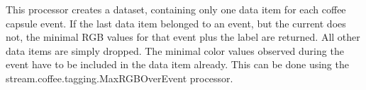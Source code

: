 This processor creates a dataset, containing only one data item for each coffee capsule event. If the last data item belonged to an event, but the current does not, the minimal RGB values for that event plus the label are returned. All other data items are simply dropped. The minimal color values observed during the event have to be included in the data item already. This can be done using the stream.coffee.tagging.MaxRGBOverEvent processor.